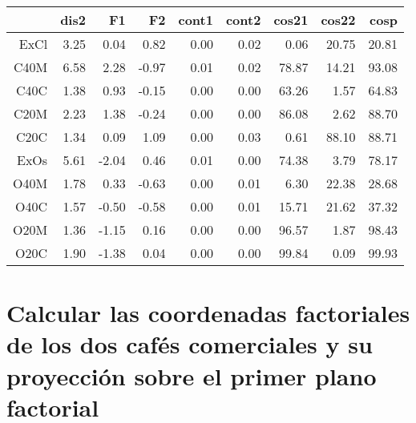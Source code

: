 \documentclass{article}
\begin{document}
\begin{table}[ht]
\centering
\begin{tabular}{rrrrrrrrr}
\hline
& dis2 & F1 & F2 & cont1 & cont2 & cos21 & cos22 & cosp \\
\hline
ExCl & 3.25 & 0.04 & 0.82 & 0.00 & 0.02 & 0.06 & 20.75 & 20.81 \\
C40M & 6.58 & 2.28 & -0.97 & 0.01 & 0.02 & 78.87 & 14.21 & 93.08 \\
C40C & 1.38 & 0.93 & -0.15 & 0.00 & 0.00 & 63.26 & 1.57 & 64.83 \\
C20M & 2.23 & 1.38 & -0.24 & 0.00 & 0.00 & 86.08 & 2.62 & 88.70 \\
C20C & 1.34 & 0.09 & 1.09 & 0.00 & 0.03 & 0.61 & 88.10 & 88.71 \\
ExOs & 5.61 & -2.04 & 0.46 & 0.01 & 0.00 & 74.38 & 3.79 & 78.17 \\
O40M & 1.78 & 0.33 & -0.63 & 0.00 & 0.01 & 6.30 & 22.38 & 28.68 \\
O40C & 1.57 & -0.50 & -0.58 & 0.00 & 0.01 & 15.71 & 21.62 & 37.32 \\
O20M & 1.36 & -1.15 & 0.16 & 0.00 & 0.00 & 96.57 & 1.87 & 98.43 \\
O20C & 1.90 & -1.38 & 0.04 & 0.00 & 0.00 & 99.84 & 0.09 & 99.93 \\
\hline
\end{tabular}
\end{table}


\section{Calcular las coordenadas factoriales de los dos cafés comerciales
y su proyección sobre el primer plano factorial}
\end{document}

